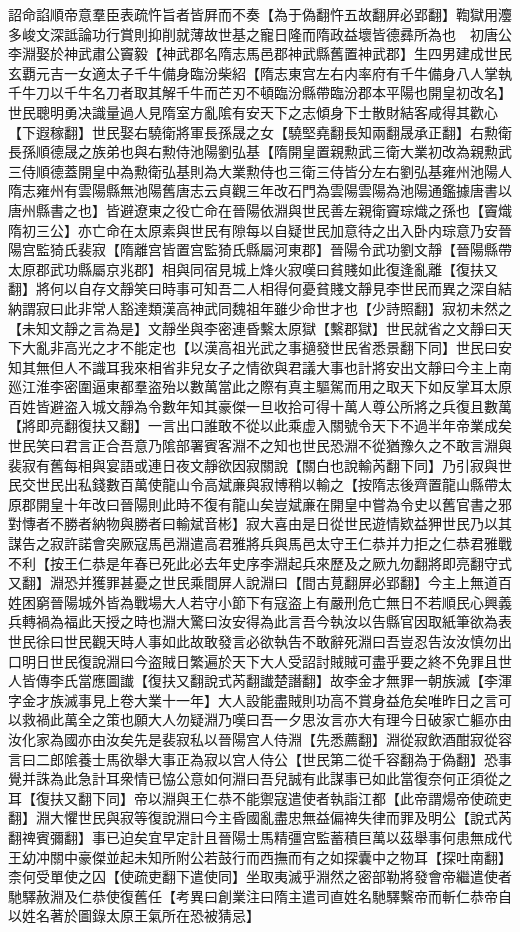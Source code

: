 詔命諂順帝意羣臣表疏忤旨者皆屛而不奏【為于偽翻忤五故翻屛必郢翻】鞫獄用灋多峻文深詆論功行賞則抑削就薄故世基之寵日隆而隋政益壞皆德彞所為也　初唐公李淵娶於神武肅公竇毅【神武郡名隋志馬邑郡神武縣舊置神武郡】生四男建成世民玄覇元吉一女適太子千牛備身臨汾柴紹【隋志東宫左右内率府有千牛備身八人掌執千牛刀以千牛名刀者取其解千牛而芒刃不頓臨汾縣帶臨汾郡本平陽也開皇初改名】世民聰明勇决識量過人見隋室方亂隂有安天下之志傾身下士散財結客咸得其歡心【下遐稼翻】世民娶右驍衛將軍長孫晟之女【驍堅堯翻長知兩翻晟承正翻】右勲衛長孫順德晟之族弟也與右勲侍池陽劉弘基【隋開皇置親勲武三衛大業初改為親勲武三侍順德蓋開皇中為勲衛弘基則為大業勲侍也三衛三侍皆分左右劉弘基雍州池陽人隋志雍州有雲陽縣無池陽舊唐志云貞觀三年改石門為雲陽雲陽為池陽通鑑據唐書以唐州縣書之也】皆避遼東之役亡命在晉陽依淵與世民善左親衛竇琮熾之孫也【竇熾隋初三公】亦亡命在太原素與世民有隙每以自疑世民加意待之出入卧内琮意乃安晉陽宫監猗氏裴寂【隋離宫皆置宫監猗氏縣屬河東郡】晉陽令武功劉文靜【晉陽縣帶太原郡武功縣屬京兆郡】相與同宿見城上烽火寂嘆曰貧賤如此復逢亂離【復扶又翻】將何以自存文靜笑曰時事可知吾二人相得何憂貧賤文靜見李世民而異之深自結納謂寂曰此非常人豁達類漢高神武同魏祖年雖少命世才也【少詩照翻】寂初未然之【未知文靜之言為是】文靜坐與李密連昏繫太原獄【繫郡獄】世民就省之文靜曰天下大亂非高光之才不能定也【以漢高祖光武之事擿發世民省悉景翻下同】世民曰安知其無但人不識耳我來相省非兒女子之情欲與君議大事也計將安出文靜曰今主上南廵江淮李密圍逼東都羣盗殆以數萬當此之際有真主驅駕而用之取天下如反掌耳太原百姓皆避盗入城文靜為令數年知其豪傑一旦收拾可得十萬人尊公所將之兵復且數萬【將即亮翻復扶又翻】一言出口誰敢不從以此乘虚入關號令天下不過半年帝業成矣世民笑曰君言正合吾意乃隂部署賓客淵不之知也世民恐淵不從猶豫久之不敢言淵與裴寂有舊每相與宴語或連日夜文靜欲因寂關說【關白也說輸芮翻下同】乃引寂與世民交世民出私錢數百萬使龍山令高斌亷與寂博稍以輸之【按隋志後齊置龍山縣帶太原郡開皇十年改曰晉陽則此時不復有龍山矣豈斌亷在開皇中嘗為令史以舊官書之邪對慱者不勝者納物與勝者曰輸斌音彬】寂大喜由是日從世民遊情欵益狎世民乃以其謀告之寂許諾會突厥寇馬邑淵遣高君雅將兵與馬邑太守王仁恭并力拒之仁恭君雅戰不利【按王仁恭是年春已死此必去年史序李淵起兵來歷及之厥九勿翻將即亮翻守式又翻】淵恐并獲罪甚憂之世民乘間屏人說淵曰【間古莧翻屏必郢翻】今主上無道百姓困窮晉陽城外皆為戰場大人若守小節下有寇盗上有嚴刑危亡無日不若順民心興義兵轉禍為福此天授之時也淵大驚曰汝安得為此言吾今執汝以告縣官因取紙筆欲為表世民徐曰世民觀天時人事如此故敢發言必欲執告不敢辭死淵曰吾豈忍告汝汝慎勿出口明日世民復說淵曰今盗賊日繁遍於天下大人受詔討賊賊可盡乎要之終不免罪且世人皆傳李氏當應圖䜟【復扶又翻說式芮翻䜟楚譖翻】故李金才無罪一朝族滅【李渾字金才族滅事見上卷大業十一年】大人設能盡賊則功高不賞身益危矣唯昨日之言可以救禍此萬全之策也願大人勿疑淵乃嘆曰吾一夕思汝言亦大有理今日破家亡軀亦由汝化家為國亦由汝矣先是裴寂私以晉陽宫人侍淵【先悉薦翻】淵從寂飲酒酣寂從容言曰二郎隂養士馬欲舉大事正為寂以宫人侍公【世民第二從千容翻為于偽翻】恐事覺并誅為此急計耳衆情已恊公意如何淵曰吾兒誠有此謀事已如此當復奈何正須從之耳【復扶又翻下同】帝以淵與王仁恭不能禦寇遣使者執詣江都【此帝謂煬帝使疏吏翻】淵大懼世民與寂等復說淵曰今主昏國亂盡忠無益偏禆失律而罪及明公【說式芮翻禆賓彌翻】事已迫矣宜早定計且晉陽士馬精彊宫監蓄積巨萬以茲舉事何患無成代王幼冲關中豪傑並起未知所附公若鼓行而西撫而有之如探囊中之物耳【探吐南翻】柰何受單使之囚【使疏吏翻下遣使同】坐取夷滅乎淵然之密部勒將發會帝繼遣使者馳驛赦淵及仁恭使復舊任【考異曰創業注曰隋主遣司直姓名馳驛繫帝而斬仁恭帝自以姓名著於圖錄太原王氣所在恐被猜忌】

